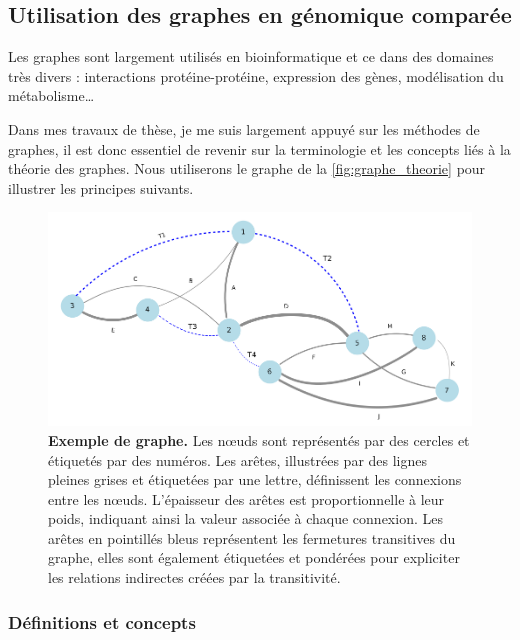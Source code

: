 \subsection{Utilisation des graphes en génomique comparée}

Les graphes sont largement utilisés en bioinformatique \cite{pavlopoulos_using_2011} et ce dans des domaines très divers : interactions protéine-protéine, expression des gènes, modélisation du métabolisme\dots 

Dans mes travaux de thèse, je me suis largement appuyé sur les méthodes de graphes, il est donc essentiel de revenir sur la terminologie et les concepts liés à la théorie des graphes. Nous utiliserons le graphe de la \autoref{fig:graphe_theorie} pour illustrer les principes suivants.

\begin{figure}[htbp]
    \centering
    \includegraphics[width=\linewidth]{images/graphe_theorie_non_orienter.png}
    \caption[Exemple de graphe]{\textbf{Exemple de graphe.} Les n\oe uds sont représentés par des cercles et étiquetés par des numéros. Les arêtes, illustrées par des lignes pleines grises et étiquetées par une lettre, définissent les connexions entre les n\oe uds. L’épaisseur des arêtes est proportionnelle à leur poids, indiquant ainsi la valeur associée à chaque connexion. Les arêtes en pointillés bleus représentent les fermetures transitives du graphe, elles sont également étiquetées et pondérées pour expliciter les relations indirectes créées par la transitivité.}
    \label{fig:graphe_theorie}
\end{figure}

\subsubsection{Définitions et concepts}

